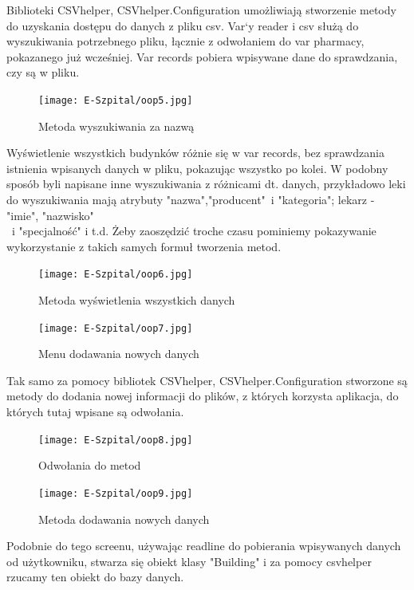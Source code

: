 Biblioteki CSVhelper, CSVhelper.Configuration umożliwiają stworzenie metody do uzyskania dostępu do danych z pliku csv. Var`y reader i csv służą do wyszukiwania potrzebnego pliku, łącznie z odwołaniem do var pharmacy, pokazanego już wcześniej. Var records pobiera wpisywane dane do sprawdzania, czy są w pliku.\newline
\begin{figure}[!ht]
	\centering
		\texttt{[image: E-Szpital/oop5.jpg]}
	\caption{\footnotesize Metoda wyszukiwania za nazwą}
	\label{fig:plotend}
\end{figure}\newline
Wyświetlenie wszystkich budynków różnie się w var records, bez sprawdzania istnienia wpisanych danych w pliku, pokazując wszystko po kolei.\newline
W podobny sposób byli napisane inne wyszukiwania z różnicami dt. danych, przykładowo leki do wyszukiwania mają atrybuty "nazwa","producent"\ i "kategoria"; lekarz - "imie", "nazwisko"\\\ i "specjalność" i t.d. Żeby zaoszędzić troche czasu pominiemy pokazywanie wykorzystanie z takich samych formuł tworzenia metod.\newline
\begin{figure}[!ht]
	\centering
		\texttt{[image: E-Szpital/oop6.jpg]}
	\caption{\footnotesize Metoda wyświetlenia wszystkich danych}
	\label{fig:plotend}
\end{figure}\newpage
\begin{figure}[!ht]
	\centering
		\texttt{[image: E-Szpital/oop7.jpg]}
	\caption{\footnotesize Menu dodawania nowych danych}
	\label{fig:plotend}
\end{figure}\newline
Tak samo za pomocy bibliotek CSVhelper, CSVhelper.Configuration stworzone są metody do dodania nowej informacji do plików, z których korzysta aplikacja, do których tutaj wpisane są odwołania.\newline
\begin{figure}[!ht]
	\centering
		\texttt{[image: E-Szpital/oop8.jpg]}
	\caption{\footnotesize Odwołania do metod}
	\label{fig:plotend}
\end{figure}\newpage
\begin{figure}[!ht]
	\centering
		\texttt{[image: E-Szpital/oop9.jpg]}
	\caption{\footnotesize Metoda dodawania nowych danych}
	\label{fig:plotend}
\end{figure}\newline
Podobnie do tego screenu, używając readline do pobierania wpisywanych danych od użytkowniku, stwarza się obiekt klasy "Building" i za pomocy csvhelper rzucamy ten obiekt do bazy danych.\newpage

